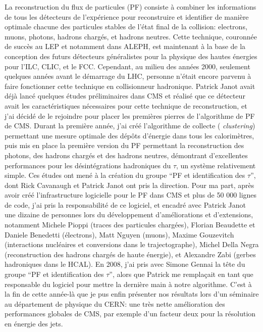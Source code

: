 La reconstruction du flux de particules (PF) consiste à combiner les informations de tous les détecteurs de l'expérience pour reconstruire et identifier de manière optimale chacune des particules stables de l'état final de la collision: electrons, muons, photons, hadrons chargés, et hadrons neutres. 
Cette technique, couronnée de succès au LEP et notamment dans ALEPH, 
est maintenant à la base de la conception des futurs détecteurs généralistes pour la physique des hautes énergies 
pour l'ILC, CLIC, et le FCC. 
Cependant, au milieu des années 2000, seulement quelques années avant le démarrage du LHC, 
personne n'était encore parvenu à faire fonctionner cette technique en collisionneur hadronique.
Patrick Janot avait déjà lancé quelques études préliminaires dans CMS et réalisé que ce détecteur avait les caractéristiques nécessaires pour cette technique de reconstruction, 
et j'ai décidé de le rejoindre pour placer les premières pierres de l'algorithme de PF de CMS.
Durant la première année, j'ai créé l'algorithme de collecte ({\em
  clustering}) permettant une mesure optimale des dépôts d'énergie
dans tous les calorimètres, puis mis en place la première version du PF permettant la reconstruction des photons, des hadrons chargés et des hadrons neutres, 
démontrant d'excellentes performances pour les désintégrations hadroniques du $\tau$, un système relativement simple.
Ces études ont mené à la création du groupe ``PF et identification des $\tau$'', dont Rick Cavanaugh et Patrick Janot ont pris la direction. 
Pour ma part, après avoir créé l'infrastructure logicielle pour le PF dans CMS et plus de 50 000 lignes de code, j'ai pris la responsabilité de ce logiciel, et encadré avec Patrick Janot une dizaine de personnes lors du développement d'améliorations et d'extensions, notamment Michele Pioppi (traces des particules chargées), Florian Beaudette et Daniele Benedetti (électrons), Matt Nguyen (muons), Maxime Gouzevitch (interactions nucléaires et conversions dans le trajectographe), Michel Della Negra (reconstruction des hadrons chargés de haute énergie), et Alexandre Zabi (gerbes hadroniques dans le HCAL).
En 2008, j'ai pris avec Simone Gennai la tête du groupe ``PF et identification des $\tau$'', alors que Patrick me remplaçait en tant que responsable du logiciel pour mettre la dernière main à notre algorithme. 
C'est à la fin de cette année-là que je pus enfin présenter nos résultats lors d'un séminaire au département de physique du CERN: une très nette amélioration des performances globales de CMS, par exemple d'un facteur deux pour la résolution en énergie des jets. 
